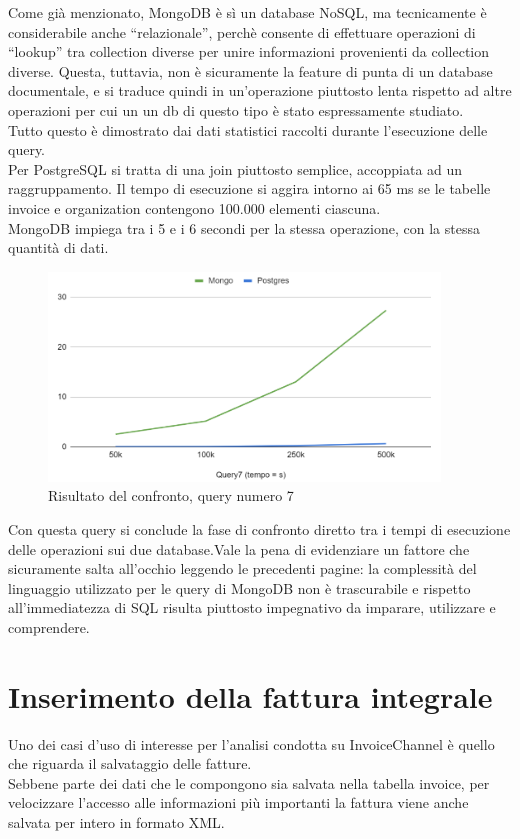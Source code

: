 \noindent Come già menzionato, MongoDB è sì un database NoSQL, ma tecnicamente è considerabile anche ``relazionale'', perchè consente di effettuare operazioni di ``lookup'' tra collection diverse per unire informazioni provenienti da collection diverse. Questa, tuttavia, non è sicuramente la feature di punta di un database documentale, e si traduce quindi in un'operazione piuttosto lenta rispetto ad altre operazioni per cui un un db di questo tipo è stato espressamente studiato.\\

\noindent Tutto questo è dimostrato dai dati statistici raccolti durante l'esecuzione delle query.\\
Per PostgreSQL si tratta di una join piuttosto semplice, accoppiata ad un raggruppamento. Il tempo di esecuzione si aggira intorno ai 65 ms se le tabelle invoice e organization contengono 100.000 elementi ciascuna.\\
MongoDB impiega tra i 5 e i 6 secondi per la stessa operazione, con la stessa quantità di dati.

\begin{figure}[htbp]
\begin{center}
\includegraphics[height=15em]{immagini/query/query7_results.png}
\caption{Risultato del confronto, query numero 7}
\end{center}
\end{figure}

\noindent Con questa query si conclude la fase di confronto diretto tra i tempi di esecuzione delle operazioni sui due database.Vale la pena di evidenziare un fattore che sicuramente salta all'occhio leggendo le precedenti pagine: la complessità del linguaggio utilizzato per le query di MongoDB non è trascurabile e rispetto all'immediatezza di SQL risulta piuttosto impegnativo da imparare, utilizzare e comprendere.

\section{Inserimento della fattura integrale}
Uno dei casi d'uso di interesse per l'analisi condotta su InvoiceChannel è quello che riguarda il salvataggio delle fatture.\\
Sebbene parte dei dati che le compongono sia salvata nella tabella invoice, per velocizzare l'accesso alle informazioni più importanti la fattura viene anche salvata per intero in formato XML.\\

